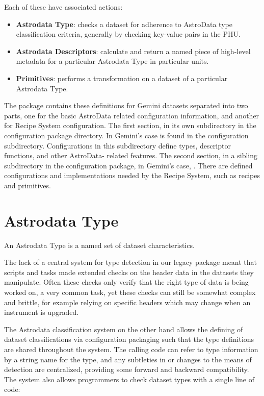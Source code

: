 \documentclass[letterpaper,10pt,english]{sphinxmanual}
\begin{document}
Each of these have associated actions:
\begin{itemize}
\item {} 
\textbf{Astrodata Type}: checks a dataset for adherence to AstroData
type classification criteria, generally by checking key-value pairs in
the PHU.

\item {} 
\textbf{Astrodata Descriptors}: calculate and return a named piece of
high-level metadata for a particular Astrodata Type in particular
units.

\item {} 
\textbf{Primitives}: performs a transformation on a dataset of a
particular Astrodata Type.

\end{itemize}

The  package contains these definitions for Gemini
datasets separated into two parts, one for the basic AstroData related
configuration information, and another for Recipe System
configuration. The first section, in its own subdirectory in the
configuration package directory. In Gemini's case is found in the
 configuration subdirectory. Configurations in this
subdirectory define types, descriptor functions, and other AstroData-
related features. The second section, in a sibling subdirectory in the
configuration package, in Gemini's case, . There are defined
configurations and implementations needed by the Recipe System, such
as recipes and primitives.


\section{Astrodata Type}
\label{gen.ADMANUAL_ADConcepts:astrodata-type}
An Astrodata Type is a named set of dataset characteristics.

The lack of a central system for type detection in our legacy package
meant that scripts and tasks made extended checks on
the header data in the datasets they manipulate. Often these checks
only verify that the right type of data is being worked on, a very
common task, yet these checks can still be somewhat complex and
brittle, for example relying on specific headers which may change when
an instrument is upgraded.

The Astrodata classification system on the other hand allows the defining
of dataset classifications via configuration packaging such that the type
definitions are shared throughout the system. The calling code can
refer to type information by a string name for the type, and any
subtleties in or changes to the means of detection are centralized,
providing some forward and backward compatibility. The system also
allows programmers to check dataset types with a single line of code:
\end{document}
